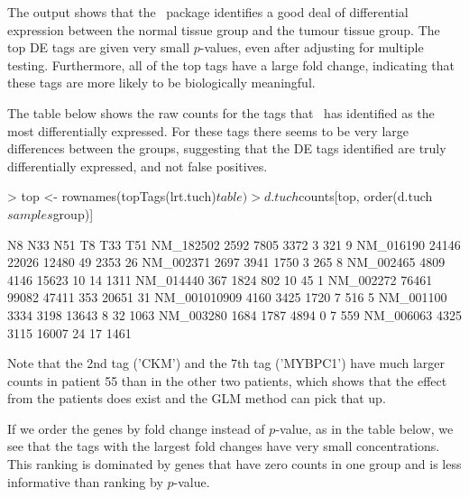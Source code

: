 The output shows that the \edgeR~package identifies a good deal of
differential expression between the normal tissue group and the tumour
tissue group. The top DE tags are given very small $p$-values, even
after adjusting for multiple testing. Furthermore, all of the top tags
have a large fold change, indicating that these tags are more likely
to be biologically meaningful.

The table below shows the raw counts for the tags that \edgeR~has
identified as the most differentially expressed. For these tags there
seems to be very large differences between the groups, suggesting that
the DE tags identified are truly differentially expressed, and not
false positives.

\begin{Schunk}
\begin{Sinput}
> top <- rownames(topTags(lrt.tuch)$table)
> d.tuch$counts[top, order(d.tuch$samples$group)]
\end{Sinput}
\begin{Soutput}
                N8   N33   N51  T8   T33  T51
NM_182502     2592  7805  3372   3   321    9
NM_016190    24146 22026 12480  49  2353   26
NM_002371     2697  3941  1750   3   265    8
NM_002465     4809  4146 15623  10    14 1311
NM_014440      367  1824   802  10    45    1
NM_002272    76461 99082 47411 353 20651   31
NM_001010909  4160  3425  1720   7   516    5
NM_001100     3334  3198 13643   8    32 1063
NM_003280     1684  1787  4894   0     7  559
NM_006063     4325  3115 16007  24    17 1461
\end{Soutput}
\end{Schunk}

Note that the 2nd tag ('CKM') and the 7th tag ('MYBPC1') have much
larger counts in patient 55 than in the other two patients, which
shows that the effect from the patients does exist and the GLM method
can pick that up.

If we order the genes by fold change instead of $p$-value, as in the
table below, we see that the tags with the largest fold changes have
very small concentrations. This ranking is dominated by genes that
have zero counts in one group and is less informative than ranking by
$p$-value.

